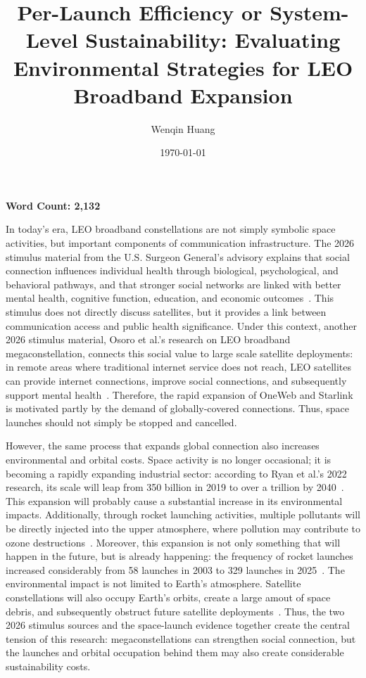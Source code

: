 \documentclass[12pt]{article}
\title{Per-Launch Efficiency or System-Level Sustainability: Evaluating Environmental Strategies for LEO Broadband Expansion}
\author{Wenqin Huang}
\date{\today}
\begin{document}
\maketitle

\begin{center}
\small \textbf{Word Count: 2,132}
\end{center}


In today's era, LEO broadband constellations are not simply symbolic space activities, but important components of communication infrastructure. The 2026 stimulus material from the U.S. Surgeon General's advisory explains that social connection influences individual health through biological, psychological, and behavioral pathways, and that stronger social networks are linked with better mental health, cognitive function, education, and economic outcomes~\citep{us_surgeon_general_2023_social_connection_health}. This stimulus does not directly discuss satellites, but it provides a link between communication access and public health significance. Under this context, another 2026 stimulus material, Osoro et al.'s research on LEO broadband megaconstellation, connects this social value to large scale satellite deployments: in remote areas where traditional internet service does not reach, LEO satellites can provide internet connections, improve social connections, and subsequently support mental health~\citep{osoro2025leo,sandau2010smallsat}. Therefore, the rapid expansion of OneWeb and Starlink is motivated partly by the demand of globally-covered connections. Thus, space launches should not simply be stopped and cancelled.



However, the same process that expands global connection also increases environmental and orbital costs. Space activity is no longer occasional; it is becoming a rapidly expanding industrial sector: according to Ryan et al.'s 2022 research, its scale will leap from 350 billion in 2019 to over a trillion by 2040~\citep{ryan2022ozone,bushnell2018newspace}. This expansion will probably cause a substantial increase in its environmental impacts. Additionally, through rocket launching activities, multiple pollutants will be directly injected into the upper atmosphere, where pollution may contribute to ozone destructions~\citep{ryan2022ozone,kokkinakis2022pollution}. Moreover, this expansion is not only something that will happen in the future, but is already happening: the frequency of rocket launches increased considerably from 58 launches in 2003 to 329 launches in 2025~\citep{mcdowell2025space}. The environmental impact is not limited to Earth's atmosphere. Satellite constellations will also occupy Earth's orbits, create a large amout of space debris, and subsequently obstruct future satellite deployments~\citep{torres2020reusable}. Thus, the two 2026 stimulus sources and the space-launch evidence together create the central tension of this research: megaconstellations can strengthen social connection, but the launches and orbital occupation behind them may also create considerable sustainability costs.
\end{document}
